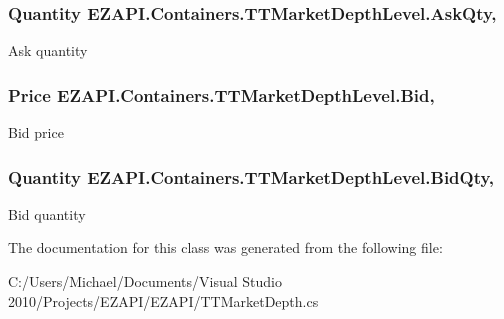 \hypertarget{class_e_z_a_p_i_1_1_containers_1_1_t_t_market_depth_level_a47030f9b968cbd8c327f754c33f5c3e7}{
\subsubsection[{Ask\-Qty}]{\setlength{\rightskip}{0pt plus 5cm}Quantity E\-Z\-A\-P\-I.\-Containers.\-T\-T\-Market\-Depth\-Level.\-Ask\-Qty\hspace{0.3cm}{\ttfamily [get]}, {\ttfamily [set]}}}\label{class_e_z_a_p_i_1_1_containers_1_1_t_t_market_depth_level_a47030f9b968cbd8c327f754c33f5c3e7}


Ask quantity 

\hypertarget{class_e_z_a_p_i_1_1_containers_1_1_t_t_market_depth_level_a29181d4fbf948b4cd2f1f5860b60472d}{
\subsubsection[{Bid}]{\setlength{\rightskip}{0pt plus 5cm}Price E\-Z\-A\-P\-I.\-Containers.\-T\-T\-Market\-Depth\-Level.\-Bid\hspace{0.3cm}{\ttfamily [get]}, {\ttfamily [set]}}}\label{class_e_z_a_p_i_1_1_containers_1_1_t_t_market_depth_level_a29181d4fbf948b4cd2f1f5860b60472d}


Bid price 

\hypertarget{class_e_z_a_p_i_1_1_containers_1_1_t_t_market_depth_level_a527925acf1a22cc66425ca52071d75a3}{
\subsubsection[{Bid\-Qty}]{\setlength{\rightskip}{0pt plus 5cm}Quantity E\-Z\-A\-P\-I.\-Containers.\-T\-T\-Market\-Depth\-Level.\-Bid\-Qty\hspace{0.3cm}{\ttfamily [get]}, {\ttfamily [set]}}}\label{class_e_z_a_p_i_1_1_containers_1_1_t_t_market_depth_level_a527925acf1a22cc66425ca52071d75a3}


Bid quantity 



The documentation for this class was generated from the following file\-:\begin{DoxyCompactItemize}
\item 
C\-:/\-Users/\-Michael/\-Documents/\-Visual Studio 2010/\-Projects/\-E\-Z\-A\-P\-I/\-E\-Z\-A\-P\-I/T\-T\-Market\-Depth.\-cs\end{DoxyCompactItemize}
